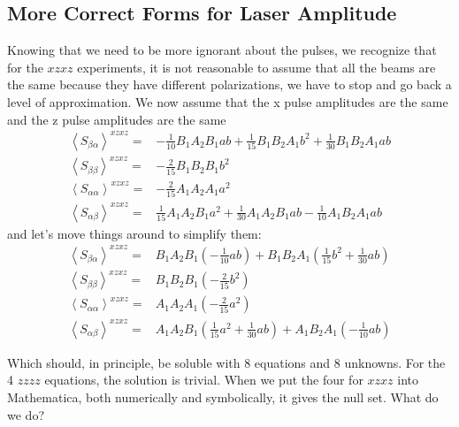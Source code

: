 \subsection{More Correct Forms for Laser Amplitude}

Knowing that we need to be more ignorant about the pulses, we recognize that for the $xzxz$ experiments, it is not reasonable to assume that all the beams are the same because they have different polarizations, we have to stop and go back a level of approximation.  We now assume that the x pulse amplitudes are the same and the z pulse amplitudes are the same
\begin{align*}
	\left \langle S_{\beta \alpha} \right \rangle^{xzxz} =&    -\frac{1}{10} B_1 A_2 B_1 a b  +  \frac{1}{15} B_1 B_2 A_1  b^2+ \frac{1}{30} B_1 B_2 A_1 a b  \\
	\left \langle S_{\beta \beta} \right \rangle^{xzxz} =&   -\frac{2}{15} B_1 B_2 B_1 b^2\\
	\left \langle S_{\alpha \alpha} \right \rangle^{xzxz} =& - \frac{2}{15} A_1 A_2 A_1 a^2  \\
	\left \langle S_{\alpha \beta} \right \rangle^{xzxz} =&   \frac{1}{15} A_1 A_2 B_1 a^2   + \frac{1}{30} A_1 A_2 B_1 a b -\frac{1}{10} A_1 B_2 A_1 a b
\end{align*}
and let's move things around to simplify them:
\begin{align*}
	\left \langle S_{\beta \alpha} \right \rangle^{xzxz} =&   B_1 A_2 B_1 \left(  -\frac{1}{10}  a b \right)   + B_1 B_2 A_1 \left(  \frac{1}{15}   b^2+ \frac{1}{30}  a b \right) \\
	\left \langle S_{\beta \beta} \right \rangle^{xzxz} =&  B_1 B_2 B_1 \left(  -\frac{2}{15}  b^2 \right) \\
	\left \langle S_{\alpha \alpha} \right \rangle^{xzxz} =& A_1 A_2 A_1\left( - \frac{2}{15}  a^2 \right)  \\
	\left \langle S_{\alpha \beta} \right \rangle^{xzxz} =&   A_1 A_2 B_1 \left( \frac{1}{15}  a^2   + \frac{1}{30}  a b \right)  + A_1 B_2 A_1  \left( -\frac{1}{10} a b   \right)
\end{align*}

Which should, in principle, be soluble with 8 equations and 8 unknowns.  For the 4 $zzzz$ equations, the solution is trivial.  When we put the four for $xzxz$ into Mathematica, both numerically and symbolically, it gives the null set.  What do we do?

